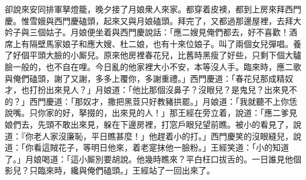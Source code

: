 卻說來安同排軍拏燈籠，晚夕接了月娘衆人來家。都穿着皮襖，都到上房來拜西門慶。惟雪娥與西門慶磕頭，起來又與月娘磕頭。拜完了，又都過那邊屋裡，去拜大妗子與三個姑子。月娘便坐着與西門慶說話：「應二嫂見俺們都去，好不喜歡！酒席上有隔壁馬家娘子和應大嫂、杜二娘，也有十來位娘子。叫了兩個女兒彈唱。養了好個平頭大臉的小厮兒。原來他房裡春花兒，比舊時黑瘦了好些，只剩下個大驢臉一般的，也不自在哩。今日亂的他家裡大小不安，本等沒人手。臨來時，應二歌與俺們磕頭，謝了又謝，多多上覆你，多謝重禮。」西門慶道：「春花兒那成精奴才，也打扮出來見人？」{}月娘道：「他比那個沒鼻子？沒眼兒？是鬼兒？出來見不的？」西門慶道：「那奴才，撒把黑荳只好教豬拱罷。」月娘道：「我就聽不上你恁說嘴。只你家的好，拏掇的，出來見的人！」那王經在旁立着，說道：「應二爹見娘們去，先頭不敢出來見，躲在下邊房裡，打窓戶眼兒望前瞧。被小的看見了，說道：『你老人家沒廉恥，平日瞧甚麼！」他趕着小的打。」西門慶笑的沒眼縫兒，{}說道：「你看這賊花子，等明日他來，着老寔抹他一臉粉。」王經笑道：「小的知道了。」月娘喝道：「這小厮別要胡說。他幾時瞧來？平白枉口拔舌的。一日誰見他個影兒？只臨來時，纔與俺們磕頭。」王經站了一回出來了。

